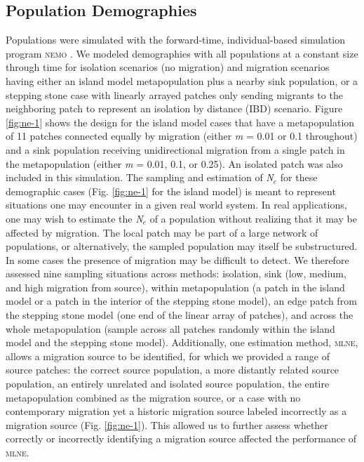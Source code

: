 \subsection{Population Demographies}
Populations were simulated with the forward-time, individual-based simulation program 
\textsc{nemo} \citep{Guillaume:2006}. We modeled demographies with all populations 
at a constant size through time for isolation scenarios (no migration) and migration scenarios 
having either an island model metapopulation plus a nearby sink population, or a stepping stone 
case with linearly arrayed patches only sending migrants to the neighboring patch to represent 
an isolation by distance (IBD) scenario. Figure \ref{fig:ne-1} shows the design for the island model cases 
that have a metapopulation of 11 patches connected equally by migration (either \emph{m} = 0.01 or 0.1 throughout) 
and a sink population receiving unidirectional migration from a single patch in the metapopulation 
(either \emph{m} = 0.01, 0.1, or 0.25). An isolated patch was also included in this simulation. The sampling 
and estimation of \emph{N}$_e$ for these demographic cases (Fig. \ref{fig:ne-1} for the island model) is meant 
to represent situations one may encounter in a given real world system. In real applications, one 
may wish to estimate the \emph{N}$_e$ of a population without realizing that it may be affected 
by migration. The local patch may be part of a large network of populations, or alternatively, the 
sampled population may itself be substructured. In some cases the presence of migration may be 
difficult to detect. We therefore assessed nine sampling situations across methods: isolation, 
sink (low, medium, and high migration from source), within metapopulation (a patch in the island 
model or a patch in the interior of the stepping stone model), an edge patch from the stepping 
stone model (one end of the linear array of patches), and across the whole metapopulation (sample 
across all patches randomly within the island model and the stepping stone model). Additionally, 
one estimation method, \textsc{mlne}, allows a migration source to be identified, for which we 
provided a range of source patches: the correct source population, a more distantly related source 
population, an entirely unrelated and isolated source population, the entire metapopulation combined 
as the migration source, or a case with no contemporary migration yet a historic migration source 
labeled incorrectly as a migration source (Fig. \ref{fig:ne-1}). This allowed us to further assess whether 
correctly or incorrectly identifying a migration source affected the performance of \textsc{mlne}.

